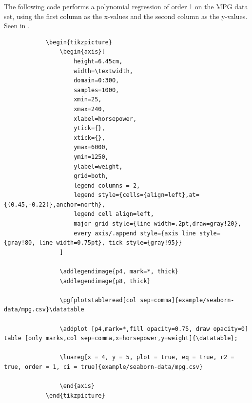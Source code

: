 \documentclass[11pt]{article}
\begin{document}
    The following code performs a polynomial regression of order 1 on the MPG data set, using the first column as the x-values and the second column as the y-values.
    Seen in .

	\begin{codebox}
	    \begin{verbatim}
	        \begin{tikzpicture}
	            \begin{axis}[
	                height=6.45cm,
	                width=\textwidth,
	                domain=0:300,
	                samples=1000,
	                xmin=25,
	                xmax=240,
	                xlabel=horsepower,
	                ytick={},
	                xtick={},
	                ymax=6000,
	                ymin=1250,
	                ylabel=weight,
	                grid=both,
	                legend columns = 2,
	                legend style={cells={align=left},at={(0.45,-0.22)},anchor=north},
	                legend cell align=left,
	                major grid style={line width=.2pt,draw=gray!20},
	                every axis/.append style={axis line style={gray!80, line width=0.75pt}, tick style={gray!95}}
	            ]
	
	            \addlegendimage{p4, mark=*, thick}
	            \addlegendimage{p8, thick}
	
	            \pgfplotstableread[col sep=comma]{example/seaborn-data/mpg.csv}\datatable
	
	            \addplot [p4,mark=*,fill opacity=0.75, draw opacity=0] table [only marks,col sep=comma,x=horsepower,y=weight]{\datatable};
	
	            \luareg[x = 4, y = 5, plot = true, eq = true, r2 = true, order = 1, ci = true]{example/seaborn-data/mpg.csv}
	
	            \end{axis}
	        \end{tikzpicture}
	    \end{verbatim}
    \end{codebox}

    \pagebreak
\end{document}
